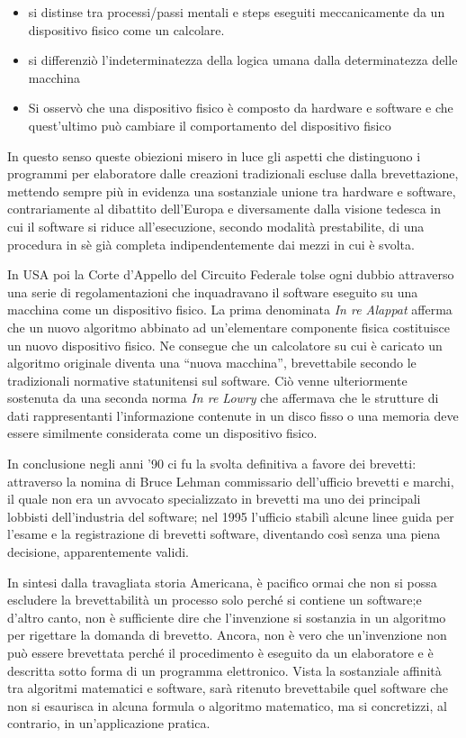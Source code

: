 \begin{itemize}
	\item si distinse tra processi/passi mentali e steps eseguiti meccanicamente da un dispositivo fisico come un calcolare.
	\item si differenziò l'indeterminatezza della logica umana dalla determinatezza delle macchina
	\item Si osservò che una dispositivo fisico è composto da hardware e software e che quest'ultimo può cambiare il comportamento del dispositivo fisico
\end{itemize}
In questo senso queste obiezioni misero in luce gli aspetti che distinguono i programmi per elaboratore dalle creazioni tradizionali escluse dalla brevettazione, mettendo sempre più in evidenza una sostanziale unione tra hardware e software, contrariamente al dibattito dell'Europa e  diversamente dalla visione tedesca in cui il software si riduce all'esecuzione, secondo modalità prestabilite, di una procedura in sè già completa indipendentemente dai mezzi in cui è svolta.

In USA poi la Corte d'Appello del Circuito Federale tolse ogni dubbio attraverso una serie di regolamentazioni che inquadravano il software eseguito su una macchina come un dispositivo fisico. La prima denominata \textit{In re Alappat} afferma che un nuovo algoritmo abbinato ad un'elementare componente fisica costituisce un nuovo dispositivo fisico. Ne consegue che un calcolatore su cui è caricato un algoritmo originale diventa una ``nuova macchina'', brevettabile secondo le tradizionali normative statunitensi sul software. Ciò venne ulteriormente sostenuta da una seconda norma \textit{In re Lowry} che affermava che le strutture di dati rappresentanti l'informazione contenute in un disco fisso o una memoria deve essere similmente considerata come un dispositivo fisico.

In conclusione negli anni '90 ci fu la svolta definitiva a favore dei brevetti: attraverso la nomina di Bruce Lehman commissario dell'ufficio brevetti e marchi, il quale non era un avvocato specializzato in brevetti ma uno dei principali lobbisti dell'industria del software; nel 1995 l'ufficio stabilì alcune linee guida per l'esame e la registrazione di brevetti software, diventando così senza una piena decisione, apparentemente validi.

In sintesi dalla travagliata storia Americana, è pacifico ormai che non si possa escludere la brevettabilità un processo solo perché si contiene un software;e d'altro canto, non è sufficiente dire che l'invenzione si sostanzia in un algoritmo per rigettare la domanda di brevetto. Ancora, non è vero che un'invenzione non può essere brevettata perché il procedimento è eseguito da un elaboratore e è descritta sotto forma di un programma elettronico. Vista la sostanziale affinità tra algoritmi matematici e software, sarà ritenuto brevettabile quel software che non si esaurisca in alcuna formula o algoritmo matematico, ma si concretizzi, al contrario, in un'applicazione pratica.


